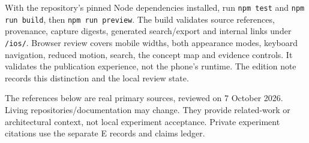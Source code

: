 \documentclass[10pt,letterpaper,twocolumn]{article}
\begin{document}
With the repository's pinned Node dependencies installed, run \texttt{npm test} and \texttt{npm run build}, then \texttt{npm run preview}. The build validates source references, provenance, capture digests, generated search/export and internal links under \texttt{/\allowbreak{}ios/\allowbreak{}}. Browser review covers mobile widths, both appearance modes, keyboard navigation, reduced motion, search, the concept map and evidence controls. It validates the publication experience, not the phone's runtime. The edition note records this distinction and the local review state.

The references below are real primary sources, reviewed on 7 October 2026. Living repositories/documentation may change. They provide related-work or architectural context, not local experiment acceptance. Private experiment citations use the separate E records and claims ledger.
\end{document}
